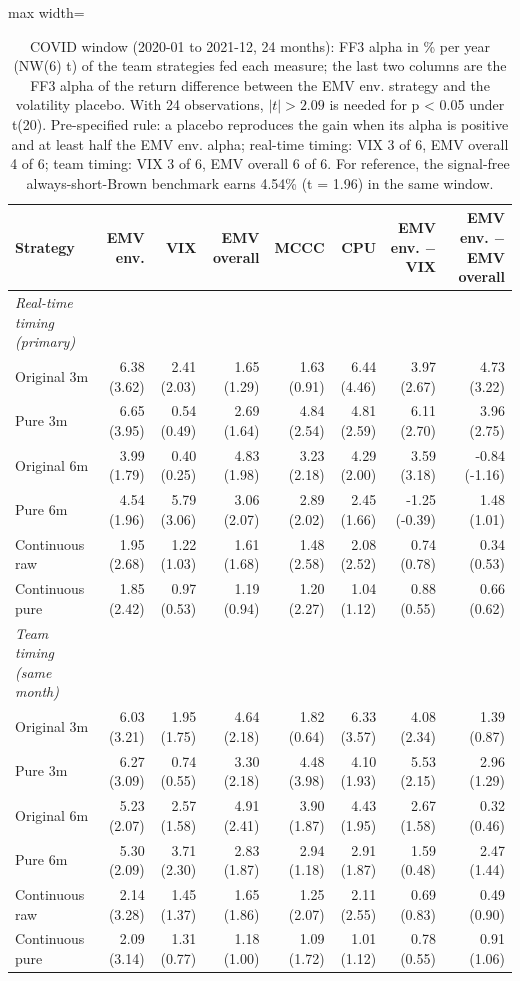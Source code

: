 \begin{table}[H]
\centering\footnotesize
\caption{COVID window (2020-01 to 2021-12, 24 months): FF3 alpha in \% per year (NW(6) t) of the team strategies fed each measure; the last two columns are the FF3 alpha of the return difference between the EMV env. strategy and the volatility placebo. With 24 observations, $|t| > 2.09$ is needed for p < 0.05 under t(20). Pre-specified rule: a placebo reproduces the gain when its alpha is positive and at least half the EMV env. alpha; real-time timing: VIX 3 of 6, EMV overall 4 of 6; team timing: VIX 3 of 6, EMV overall 6 of 6. For reference, the signal-free always-short-Brown benchmark earns 4.54\% (t = 1.96) in the same window.}
\label{tab:m1b_placebo_covid}
\begin{adjustbox}{max width=\linewidth}
\begin{tabular}{lrrrrrrr}
\toprule
Strategy & EMV env. & VIX & EMV overall & MCCC & CPU & EMV env. $-$ VIX & EMV env. $-$ EMV overall \\
\midrule
\textit{Real-time timing (primary)} &  &  &  &  &  &  &  \\
Original 3m & 6.38 (3.62) & 2.41 (2.03) & 1.65 (1.29) & 1.63 (0.91) & 6.44 (4.46) & 3.97 (2.67) & 4.73 (3.22) \\
Pure 3m & 6.65 (3.95) & 0.54 (0.49) & 2.69 (1.64) & 4.84 (2.54) & 4.81 (2.59) & 6.11 (2.70) & 3.96 (2.75) \\
Original 6m & 3.99 (1.79) & 0.40 (0.25) & 4.83 (1.98) & 3.23 (2.18) & 4.29 (2.00) & 3.59 (3.18) & -0.84 (-1.16) \\
Pure 6m & 4.54 (1.96) & 5.79 (3.06) & 3.06 (2.07) & 2.89 (2.02) & 2.45 (1.66) & -1.25 (-0.39) & 1.48 (1.01) \\
Continuous raw & 1.95 (2.68) & 1.22 (1.03) & 1.61 (1.68) & 1.48 (2.58) & 2.08 (2.52) & 0.74 (0.78) & 0.34 (0.53) \\
Continuous pure & 1.85 (2.42) & 0.97 (0.53) & 1.19 (0.94) & 1.20 (2.27) & 1.04 (1.12) & 0.88 (0.55) & 0.66 (0.62) \\
\textit{Team timing (same month)} &  &  &  &  &  &  &  \\
Original 3m & 6.03 (3.21) & 1.95 (1.75) & 4.64 (2.18) & 1.82 (0.64) & 6.33 (3.57) & 4.08 (2.34) & 1.39 (0.87) \\
Pure 3m & 6.27 (3.09) & 0.74 (0.55) & 3.30 (2.18) & 4.48 (3.98) & 4.10 (1.93) & 5.53 (2.15) & 2.96 (1.29) \\
Original 6m & 5.23 (2.07) & 2.57 (1.58) & 4.91 (2.41) & 3.90 (1.87) & 4.43 (1.95) & 2.67 (1.58) & 0.32 (0.46) \\
Pure 6m & 5.30 (2.09) & 3.71 (2.30) & 2.83 (1.87) & 2.94 (1.18) & 2.91 (1.87) & 1.59 (0.48) & 2.47 (1.44) \\
Continuous raw & 2.14 (3.28) & 1.45 (1.37) & 1.65 (1.86) & 1.25 (2.07) & 2.11 (2.55) & 0.69 (0.83) & 0.49 (0.90) \\
Continuous pure & 2.09 (3.14) & 1.31 (0.77) & 1.18 (1.00) & 1.09 (1.72) & 1.01 (1.12) & 0.78 (0.55) & 0.91 (1.06) \\
\bottomrule
\end{tabular}
\end{adjustbox}
\end{table}
